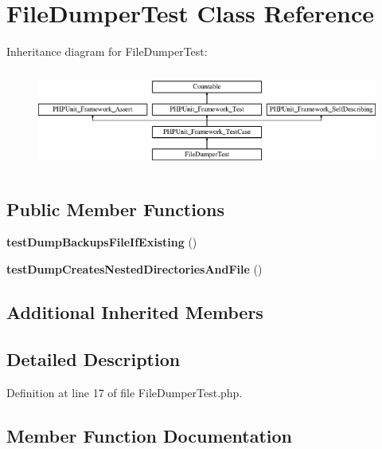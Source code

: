 \section{File\+Dumper\+Test Class Reference}
\label{class_symfony_1_1_component_1_1_translation_1_1_tests_1_1_dumper_1_1_file_dumper_test}
Inheritance diagram for File\+Dumper\+Test\+:\begin{figure}[H]
\begin{center}
\leavevmode
\includegraphics[height=3.303835cm]{class_symfony_1_1_component_1_1_translation_1_1_tests_1_1_dumper_1_1_file_dumper_test}
\end{center}
\end{figure}
\subsection*{Public Member Functions}
\begin{DoxyCompactItemize}
\item 
{\bf test\+Dump\+Backups\+File\+If\+Existing} ()
\item 
{\bf test\+Dump\+Creates\+Nested\+Directories\+And\+File} ()
\end{DoxyCompactItemize}
\subsection*{Additional Inherited Members}


\subsection{Detailed Description}


Definition at line 17 of file File\+Dumper\+Test.\+php.



\subsection{Member Function Documentation}
